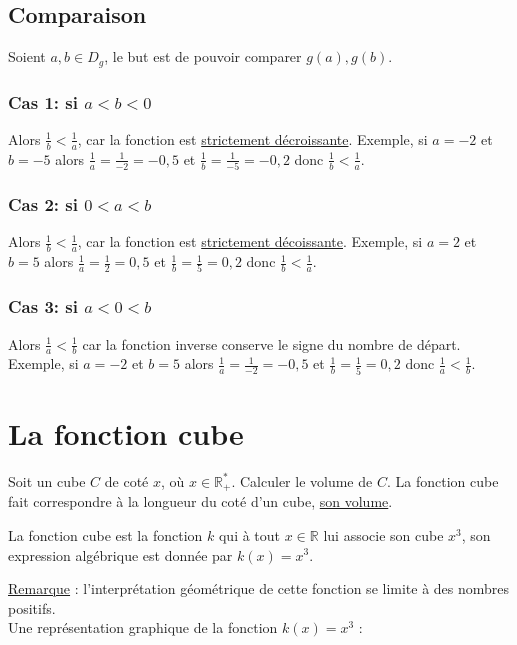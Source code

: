 \documentclass[french]{book}
\begin{document}
\subsection*{Comparaison}
Soient $a,b \in D_g$, le but est de pouvoir comparer $g(a),g(b)$.
\subsubsection*{Cas 1: si $a<b<0$}
Alors $\frac{1}{b} < \frac{1}{a}$, car la fonction est \underline{strictement décroissante}. Exemple, si $a=-2$ et $b=-5$ alors $\frac{1}{a}=\frac{1}{-2}=-0,5$ et $\frac{1}{b}=\frac{1}{-5}=-0,2$ donc $\frac{1}{b} < \frac{1}{a}$.
\subsubsection*{Cas 2: si  $0<a<b$}
Alors $\frac{1}{b}<\frac{1}{a}$, car la fonction est \underline{strictement décoissante}. Exemple, si $a=2$ et $b=5$ alors $\frac{1}{a}=\frac{1}{2}=0,5$ et $\frac{1}{b}=\frac{1}{5}=0,2$ donc $\frac{1}{b} < \frac{1}{a}$.
\subsubsection*{Cas 3: si $a<0<b$}
Alors $\frac{1}{a} < \frac{1}{b}$ car la fonction inverse conserve le signe du nombre de départ. Exemple, si $a=-2$ et $b=5$ alors $\frac{1}{a}=\frac{1}{-2}=-0,5$ et $\frac{1}{b}=\frac{1}{5}=0,2$ donc $\frac{1}{a} < \frac{1}{b}$.

\section{La fonction cube}

Soit un cube $C$ de coté $x$, où $x \in \mathbb{R}_+^*$. Calculer le volume de $C$.
La fonction cube fait correspondre à la longueur du coté d'un cube, \underline{son volume}.

\begin{defn}
La fonction cube est la fonction $k$ qui à tout $x \in \mathbb{R}$ lui associe son cube $x^3$, son expression algébrique est donnée par $k(x)=x^3$.\\
\end{defn}

\underline{Remarque} : l'interprétation géométrique de cette fonction se limite à des nombres positifs.\\


Une représentation graphique de la fonction $k(x)=x^3$ :
\end{document}
